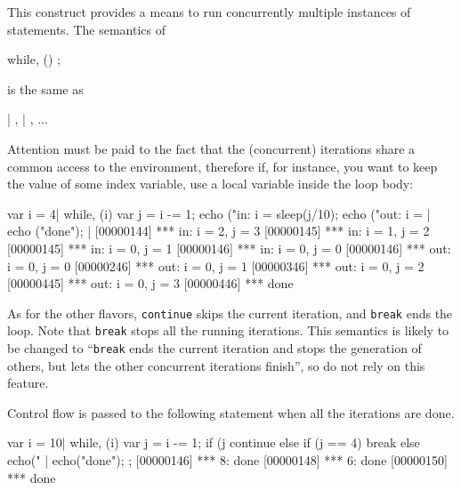 This construct provides a means to run concurrently multiple instances
of statements.  The semantics of

\begin{urbiunchecked}
while, ()
  ;
\end{urbiunchecked}

\noindent
is the same as

\begin{urbiunchecked}
 |  ,  |  , ...
\end{urbiunchecked}

Attention must be paid to the fact that the (concurrent) iterations
share a common access to the environment, therefore if, for instance,
you want to keep the value of some index variable, use a local
variable inside the loop body:

\begin{urbiscript}
{
  var i = 4|
  while, (i)
  {
    var j = i -= 1;
    echo ("in: i = %
    sleep(j/10);
    echo ("out: i = %
  }|
  echo ("done");
}|
[00000144] *** in: i = 2, j = 3
[00000145] *** in: i = 1, j = 2
[00000145] *** in: i = 0, j = 1
[00000146] *** in: i = 0, j = 0
[00000146] *** out: i = 0, j = 0
[00000246] *** out: i = 0, j = 1
[00000346] *** out: i = 0, j = 2
[00000445] *** out: i = 0, j = 3
[00000446] *** done
\end{urbiscript}

As for the other flavors, \lstinline|continue| skips the current
iteration, and \lstinline|break| ends the loop.  Note that
\lstinline|break| stops all the running iterations.  This semantics is
likely to be changed to ``\lstinline|break| ends the current iteration
and stops the generation of others, but lets the other concurrent
iterations finish'', so do not rely on this feature.

Control flow is passed to the following statement when all the
iterations are done.

\begin{urbiscript}[firstnumber=last]
{
  var i = 10|
  while, (i)
  {
    var j = i -= 1;
    if (j %
      continue
    else if (j == 4)
      break
    else
      echo("%
  }|
  echo("done");
};
[00000146] *** 8: done
[00000148] *** 6: done
[00000150] *** done
\end{urbiscript}



